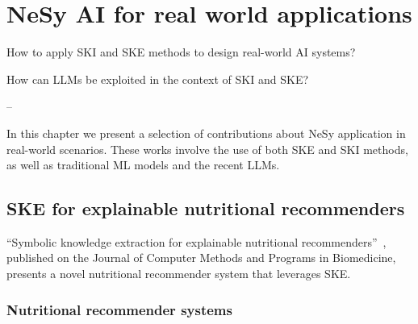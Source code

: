 
\chapter{NeSy AI for real world applications}
\label{ch:nesy-ai-for-real-world-applications}

\begin{flushright}
\begin{minipage}{0.5\textwidth}
    How to apply \gls{SKI} and \gls{SKE} methods to design real-world \gls{AI} systems?

    How can \glspl{LLM} be exploited in the context of \gls{SKI} and \gls{SKE}?

    -- \textbf{}
\end{minipage}
\end{flushright}

\mtcaddchapter
\minitoc


%
In this chapter we present a selection of contributions about \gls{NeSy} application in real-world scenarios.
%
These works involve the use of both \gls{SKE} and \gls{SKI} methods, as well as traditional \gls{ML} models and the recent \glspl{LLM}.


\section{\Gls{SKE} for explainable nutritional recommenders}\label{sec:ske-for-explainable-nutritional-recommenders}
%
``Symbolic knowledge extraction for explainable nutritional recommenders''~\cite{DBLP:journals/cmpb/MagniniCCAO23}, published on the Journal of Computer Methods and Programs in Biomedicine, presents a novel nutritional recommender system that leverages \gls{SKE}.


\subsection{Nutritional recommender systems}\label{subsec:nutritional-recommender-systems}

